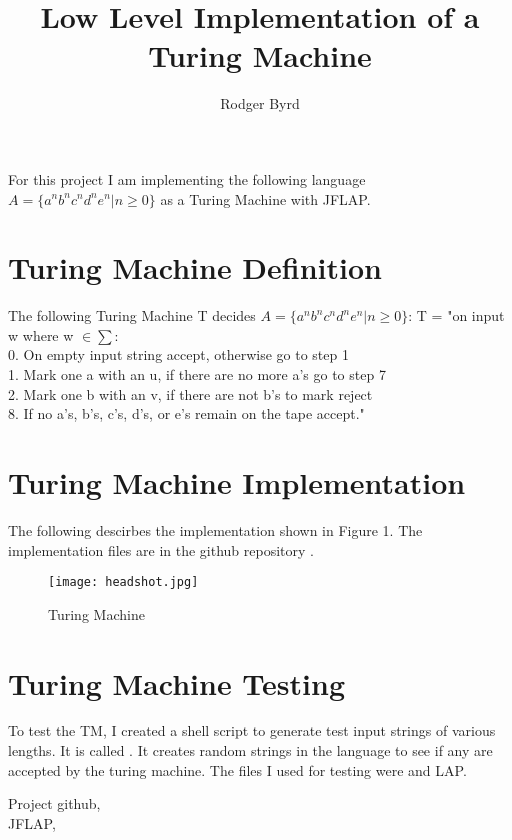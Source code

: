 \documentclass{article}
\begin{document}
\raggedright
\doublespacing

\title{Low Level Implementation of a Turing Machine}
\author{Rodger Byrd}
\maketitle
For this project I am implementing the following language $A=\{a^{n}b^{n}c^{n}d^{n}e^{n} \vert n \geq 0\}$ as a Turing Machine with JFLAP\cite{jflap}.

\section{Turing Machine Definition}
The following Turing Machine T decides $A=\{a^{n}b^{n}c^{n}d^{n}e^{n} \vert n \geq 0\}$:\break
T = "on input w where w $ \in \sum$:\\
\hspace{20 pt} 0. On empty input string accept, otherwise go to step 1\\
\hspace{20 pt} 1. Mark one a with an u, if there are no more a's go to step 7\\
\hspace{20 pt} 2. Mark one b with an v, if there are not b's to mark reject\\

\hspace{20 pt} 8. If no a's, b's, c's, d's, or e's remain on the tape accept."
\section{Turing Machine Implementation}
The following descirbes the implementation shown in Figure 1. The implementation files are in the github repository \cite{git}.\\
\begin{figure}[H]
  \texttt{[image: headshot.jpg]}
  \caption{Turing Machine}
  \label{fig:TM1}
\end{figure}


\section{Turing Machine Testing}
To test the TM, I created a shell script to generate test input strings of various lengths. It is called . It creates random strings in the language to see if any are accepted by the turing machine. The files I used for testing were  and LAP.

\begin{thebibliography}{9}
Project github, \\
JFLAP, \\
\end{thebibliography}
\end{document}
